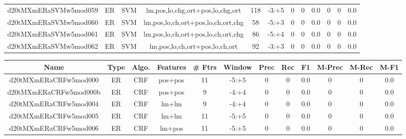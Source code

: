\documentclass[a4paper]{article}
\begin{document}
\begin{landscape}
\begin{center}
\begin{tabular}{ |c|c|c|c|c|c|c|c|c|c|c|c|}
 
 	
 	\small{ d20tMXmERaSVMw5mod059 } & ER & SVM & lm,pos,lo,chg,ort+pos,lo,chg,ort  &  118 &  -3:+5  &  0 & 0 & 0.0  &  0 & 0 & 0.0 \\
 	

 
 	
 	\small{ d20tMXmERaSVMw5mod060 } & ER & SVM & lm,pos,lo,ch,ort+pos,lo,ch,ort,chg  &  58 &  -5:+3  &  0 & 0 & 0.0  &  0 & 0 & 0.0 \\
 	

 
 	
 	\small{ d20tMXmERaSVMw5mod061 } & ER & SVM & lm,pos,lo,ch,ort+pos,lo,ch,ort,chg  &  86 &  -5:+4  &  0 & 0 & 0.0  &  0 & 0 & 0.0 \\
 	

 
 	
 	\small{ d20tMXmERaSVMw5mod062 } & ER & SVM & lm,pos,lo,ch,ort+pos,lo,ch,ort  &  92 &  -3:+3  &  0 & 0 & 0.0  &  0 & 0 & 0.0 \\
 	
 \hline
\end{tabular}
\end{center}




\begin{center}
\begin{tabular}{ |c|c|c|c|c|c|c|c|c|c|c|c|} 
 \hline
 	Name & Type & Algo. & Features & \# Ftrs & Window & Prec & Rec & F1 & M-Prec & M-Rec & M-F1\\
 \hline

 	

 
 	
 	\small{ d20tMXmERaCRFw5mod000 } & ER & CRF & pos+pos  &  11 &  -5:+5  &  0 & 0 & 0.0  &  0 & 0 & 0.0 \\
 	

 
 	
 	\small{ d20tMXmERaCRFw5mod000b } & ER & CRF & pos+pos  &  9 &  -4:+4  &  0 & 0 & 0.0  &  0 & 0 & 0.0 \\
 	

 
 	
 	\small{ d20tMXmERaCRFw5mod004 } & ER & CRF & lm+lm  &  9 &  -4:+4  &  0 & 0 & 0.0  &  0 & 0 & 0.0 \\
 	

 
 	
 	\small{ d20tMXmERaCRFw5mod005 } & ER & CRF & lm+lm  &  11 &  -5:+5  &  0 & 0 & 0.0  &  0 & 0 & 0.0 \\
 	

 
 	
 	\small{ d20tMXmERaCRFw5mod006 } & ER & CRF & lm+pos  &  11 &  -5:+5  &  0 & 0 & 0.0  &  0 & 0 & 0.0 \\
 	


\end{tabular}
\end{center}
\end{landscape}
\end{document}
